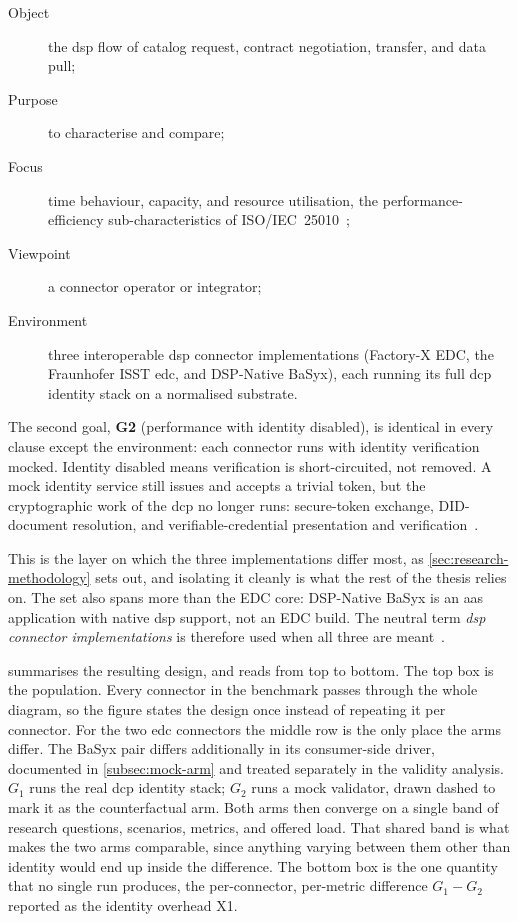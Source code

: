 \begin{description}
    \item[Object] the \gls{dsp} flow of catalog request, contract negotiation, transfer, and data pull;
    \item[Purpose] to characterise and compare;
    \item[Focus] time behaviour, capacity, and resource utilisation, the performance-efficiency sub-characteristics of ISO/IEC~25010~\citep{iso25010};
    \item[Viewpoint] a connector operator or integrator;
    \item[Environment] three interoperable \gls{dsp} connector implementations (Factory-X EDC, the Fraunhofer ISST \gls{edc}, and DSP-Native BaSyx), each running its full \gls{dcp} identity stack on a normalised substrate.
\end{description}

The second goal, \textbf{G2} (performance with identity disabled), is identical in every clause except the environment: each connector runs with identity verification mocked. Identity disabled means verification is short-circuited, not removed. A mock identity service still issues and accepts a trivial token, but the cryptographic work of the \gls{dcp} no longer runs: secure-token exchange, DID-document resolution, and verifiable-credential presentation and verification~\citep{eclipseEdcIdentityHub}.

This is the layer on which the three implementations differ most, as \cref{sec:research-methodology} sets out, and isolating it cleanly is what the rest of the thesis relies on. The set also spans more than the EDC core: DSP-Native BaSyx is an \gls{aas} application with native \gls{dsp} support, not an EDC build. The neutral term \emph{\gls{dsp} connector implementations} is therefore used when all three are meant~\citep{dam2024surveydataspaceconnectorimplementations}.

 summarises the resulting design, and reads from top to bottom. The top box is the population. Every connector in the benchmark passes through the whole diagram, so the figure states the design once instead of repeating it per connector. For the two \gls{edc} connectors the middle row is the only place the arms differ. The BaSyx pair differs additionally in its consumer-side driver, documented in \cref{subsec:mock-arm} and treated separately in the validity analysis. $G_1$ runs the real \gls{dcp} identity stack; $G_2$ runs a mock validator, drawn dashed to mark it as the counterfactual arm. Both arms then converge on a single band of research questions, scenarios, metrics, and offered load. That shared band is what makes the two arms comparable, since anything varying between them other than identity would end up inside the difference. The bottom box is the one quantity that no single run produces, the per-connector, per-metric difference $G_1 - G_2$ reported as the identity overhead X1.

